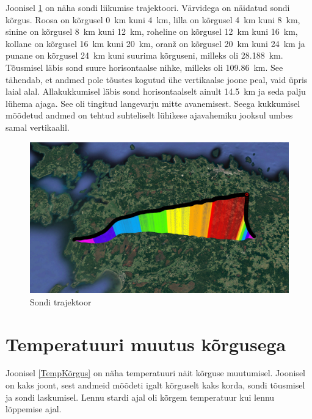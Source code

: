 \documentclass{trkut}%
\begin{document}
Joonisel \ref{trajektoor} on näha sondi liikumise trajektoori. Värvidega on näidatud sondi kõrgus. Roosa on kõrgusel \SI{0}{km} kuni \SI{4}{km}, lilla on kõrgusel \SI{4}{km} kuni \SI{8}{km}, sinine on kõrgusel \SI{8}{km} kuni \SI{12}{km}, roheline on kõrgusel \SI{12}{km} kuni \SI{16}{km}, kollane on kõrgusel \SI{16}{km} kuni \SI{20}{km}, oranž on kõrgusel \SI{20}{km} kuni \SI{24}{km} ja punane on kõrgusel \SI{24}{km} kuni suurima kõrguseni, milleks oli \SI{28.188}{km}. Tõusmisel läbis sond suure horisontaalse nihke, milleks oli \SI{109.86}{km}. See tähendab, et andmed pole tõustes kogutud ühe vertikaalse joone peal, vaid üpris laial alal. Allakukkumisel läbis sond horisontaalselt ainult \SI{14.5}{km} ja seda palju lühema ajaga. See oli tingitud langevarju mitte avanemisest. Seega kukkumisel mõõdetud andmed on tehtud suhteliselt lühikese ajavahemiku jooksul umbes samal vertikaalil.
\begin{figure}[h]
	\includegraphics[width=1\textwidth]{PicGra/teekond.jpg}
	\caption{Sondi trajektoor}
	\label{trajektoor}%
\end{figure}

\section{Temperatuuri muutus kõrgusega}
Joonisel \ref{TempKõrgus} on näha temperatuuri näit kõrguse muutumisel. Joonisel on kaks joont, sest andmeid mõõdeti igalt kõrguselt kaks korda, sondi tõusmisel ja sondi laskumisel. Lennu stardi ajal oli kõrgem temperatuur kui lennu lõppemise ajal.
\end{document}
